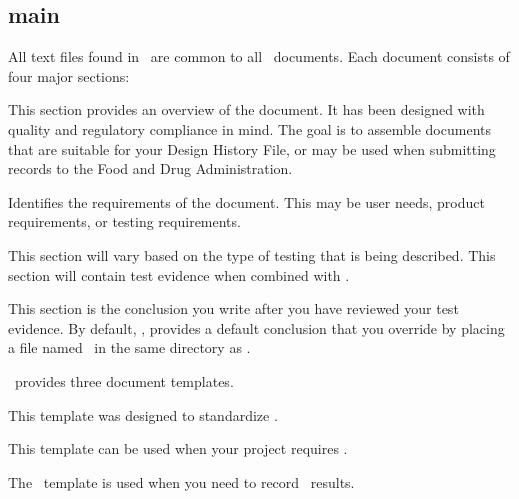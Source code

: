 \subsection{main}
All text files found in \adBoilerplate\ are common to all \adAutoDoc\ documents.
Each document consists of four major sections:

\begin{description}[leftmargin=3cm, style=nextline]
  \item[Overview:] This section provides an overview of the document.  It has
    been designed with quality and regulatory compliance in mind.  The goal is
    to assemble documents that are suitable for your Design History File, or may
    be used when submitting records to the Food and Drug Administration.

  \item[Requirements:] Identifies the requirements of the document.  This may be
    user needs, product requirements, or testing requirements.

  \item[Test Plan Overview:] This section will vary based on the type of testing
    that is being described.  This section will contain test evidence when
    combined with \adAmber.

  \item[Conclusion:] This section is the conclusion you write after you have
    reviewed your test evidence.  By default, \adAutoDoc, provides a default
    conclusion that you override by placing a file named \adConclusion\ in the same
    directory as \adStarterkit.

\end{description}

\adAutoDoc\ provides three document templates.

\begin{description}[leftmargin=3cm, style=nextline]
  \item[\adToolTest:] This template was designed to standardize
    \adToolTestTemplate.

  \item[\adUnitTest:] This template can be used when your project requires
    \adUnitTestTemplate.

  \item[\adVerTest:] The \adVerTestTemplate\ template is used when you need to
    record \adUnitTestTemplate\ results.

\end{description}

